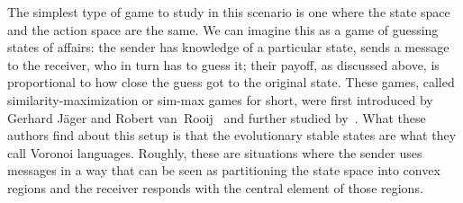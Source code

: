 \documentclass[a4paper]{article}
\begin{document}
The simplest type of game to study in this scenario is one where the state space and the action space are the same. 
We can imagine this as a game of guessing states of affairs: the sender has knowledge of a particular state, sends a message to the receiver, who in turn has to guess it; their payoff, as discussed above, is proportional to how close the guess got to the original state.
These games, called similarity-maximization or sim-max games for short, were first introduced by Gerhard J{\"a}ger and Robert van~Rooij~\parencite{jager_language_2007,Jager2007} and further studied by~\textcite{jager_voronoi_2011}.
What these authors find about this setup is that the evolutionary stable states are what they call Voronoi languages.
Roughly, these are situations where the sender uses messages in a way that can be seen as partitioning the state space into convex regions and the receiver responds with the central element of those regions.
\end{document}
